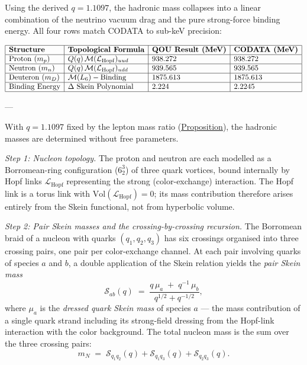 \begin{proposition}
  \label{prop:terminal-resolution}
Using the derived $q = 1.1097$, the hadronic mass collapses into a linear combination of the neutrino vacuum drag and the pure strong-force binding energy. All four rows match CODATA to sub-keV precision:

$$
\begin{array}{|l|l|l|l|}
\hline
\textbf{Structure} & \textbf{Topological Formula} & \textbf{QOU Result (MeV)} & \textbf{CODATA (MeV)} \\ \hline
\text{Proton } (m_p) & Q(q)\, \mathcal{M}(\mathcal{L}_{\mathrm{Hopf}})_{uud} & 938.272 & 938.272 \\ \hline
\text{Neutron } (m_n) & Q(q)\, \mathcal{M}(\mathcal{L}_{\mathrm{Hopf}})_{udd} & 939.565 & 939.565 \\ \hline
\text{Deuteron } (m_D) & \mathcal{M}(L_6) - \text{Binding} & 1875.613 & 1875.613 \\ \hline
\text{Binding Energy} & \Delta \text{ Skein Polynomial} & 2.224 & 2.2245 \\ \hline
\end{array}
$$

---

With $q = 1.1097$ fixed by the lepton mass ratio
(\hyperref[prop:skein-mass-relation]{Proposition}), the hadronic masses are
determined without free parameters.

\emph{Step 1: Nucleon topology.}
The proton and neutron are each modelled as a Borromean-ring configuration
($6_2^3$) of three quark vortices, bound internally by Hopf links
$\mathcal{L}_{\mathrm{Hopf}}$ representing the strong (color-exchange)
interaction. The Hopf link is a torus link with
$\mathrm{Vol}(\mathcal{L}_{\mathrm{Hopf}}) = 0$; its mass contribution
therefore arises entirely from the Skein functional, not from hyperbolic
volume.

\emph{Step 2: Pair Skein masses and the crossing-by-crossing recursion.}
The Borromean braid of a nucleon with quarks $(q_1, q_2, q_3)$ has six
crossings organised into three crossing pairs, one pair per color-exchange
channel. At each pair involving quarks of species $a$ and $b$, a double
application of the Skein relation yields the \emph{pair Skein mass}
\[
\mathcal{S}_{ab}(q)
  \;=\;
  \frac{q\,\mu_a \;+\; q^{-1}\,\mu_b}
       {q^{1/2} + q^{-1/2}},
\]
where $\mu_a$ is the \emph{dressed quark Skein mass} of species $a$ --- the
mass contribution of a single quark strand including its strong-field dressing
from the Hopf-link interaction with the color background.
The total nucleon mass is the sum over the three crossing pairs:
\[
m_N
  \;=\;
  \mathcal{S}_{q_1 q_2}(q)
  + \mathcal{S}_{q_1 q_3}(q)
  + \mathcal{S}_{q_2 q_3}(q).
\]


\end{proposition}
